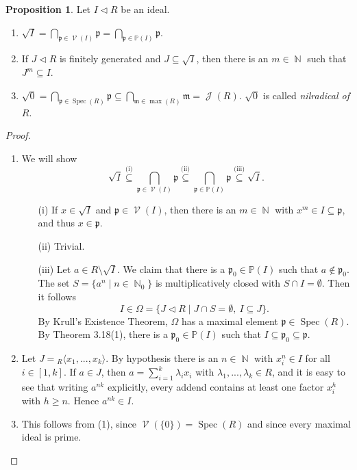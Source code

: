 \documentclass[12pt,a4paper]{report}
\theoremstyle{definition}
\newtheorem{proposition}[theorem]{Proposition}
\theoremstyle{num.custom-title}
\DeclareMathOperator{\J}{\mathcal{J}}
\DeclareMathOperator{\N}{\mathbb{N}}
\DeclareMathOperator{\V}{\mathcal{V}}
\DeclareMathOperator{\sm}{\setminus}
\DeclareMathOperator{\sse}{\subseteq}
\DeclareMathOperator{\Spec}{Spec}
\newcommand{\p}{\mathfrak{p}}
\newcommand{\m}{\mathfrak{m}}
\renewcommand{\P}{\mathbb{P}}
\begin{document}
\begin{proposition}
Let $I \lhd R$ be an ideal.
\begin{enumerate}
\item $\displaystyle \sqrt{I} = \bigcap_{\p \in \V(I)} \p = \bigcap_{\p \in \P(I)} \p$.
\item If $J \lhd R$ is finitely generated and $J \sse \sqrt{I}$, then there is an $m \in \N$ such that $J^m \sse I$.
\item $\displaystyle \sqrt{0} = \bigcap_{\p \in \Spec(R)} \p \sse \bigcap_{\m \in \max(R)} \m = \J(R)$. $\sqrt{0}$ is called \emph{nilradical of $R$}.
\end{enumerate}
\begin{proof}\ 
\begin{enumerate}
\item We will show
\[
\sqrt{I} \stackrel{\text{(i)}}{\sse} \bigcap_{\p \in \V(I)} \p \stackrel{\text{(ii)}}{\sse} \bigcap_{\p \in \P(I)} \p \stackrel{\text{(iii)}}{\sse} \sqrt{I}.
\]
\begin{enumerate}
\item[(i)] If $x \in \sqrt{I}$ and $\p \in \V(I)$, then there is an $m \in \N$ with $x^m \in I \sse \p$, and thus $x \in \p$.
\item[(ii)] Trivial.
\item[(iii)] Let $a \in R \sm \sqrt{I}$. We claim that there is a $\p_0 \in \P(I)$ such that $a \not\in \p_0$. The set $S=\{a^n \mid n \in \N_0 \}$ is multiplicatively closed with $S \cap I = \emptyset$. Then it follows
\[
I \in \Omega = \{ J \lhd R \mid J \cap S = \emptyset, \ I \sse J \}.
\]
By Krull's Existence Theorem, $\Omega$ has a maximal element $\p \in \Spec(R)$. By Theorem 3.18(1), there is a $\p_0 \in \P(I)$ such that $I \sse \p_0 \sse \p$.
\end{enumerate}
\item Let $J = {}_R \langle x_1,...,x_k \rangle$. By hypothesis there is an $n \in \N$ with $x_i^n \in I$ for all $i \in [1,k]$. If $a \in J$, then $a = \sum_{i=1}^k \lambda_i x_i$ with $\lambda_1,...,\lambda_k \in R$, and it is easy to see that writing $a^{nk}$ explicitly, every addend contains at least one factor $x_i^h$ with $h \geq n$. Hence $a^{nk} \in I$.
\item This follows from (1), since $\V(\{0\}) = \Spec(R)$ and since every maximal ideal is prime.
\end{enumerate}
\end{proof}
\end{proposition}
\end{document}
